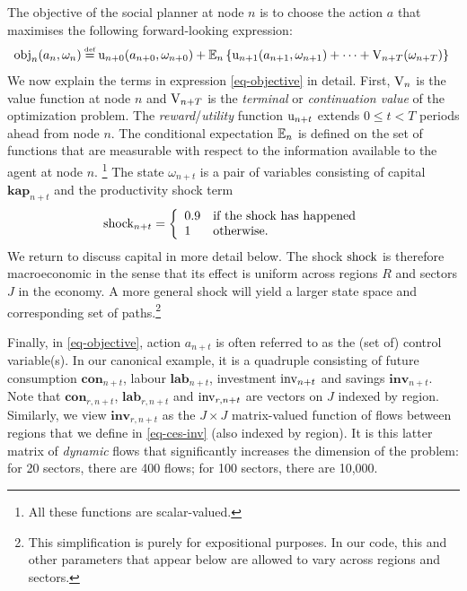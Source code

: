 \documentclass[12pt,a4paper,twoside, draft]{article}
\begin{document}
The objective of the social planner at node $n$ is to choose the action $a$
that maximises the following forward-looking expression:
\begin{align}\label{eq-objective}
\hskip-3pt   \textup{obj}_{n}(a_{n}, \omega_{n}) \defeq
   \textup{u}_{n + 0}(a_{n + 0}, \omega_{n + 0})
    + \mbb{E}_{n}\left\{
      \textup{u}_{n + 1}(a_{n + 1}, \omega_{n + 1}) + \cdots
      + \textup{V}_{n + T}(\omega_{n + T})
    \right\}
\end{align}
We now explain the terms in expression \eqref{eq-objective} in detail.
First, $\textup{V}_{n}$ is the value function at node $n$ and
$\textup{V}_{n + T}$ is the \emph{terminal} or \emph{continuation value} of the
optimization problem.
The \emph{reward}/\emph{utility} function $\textup{u}_{n + t}$ extends
$0 \leq t < T$ periods ahead from node $n$.
The conditional expectation $\mathbb{E}_{n}$ is defined on the set of functions
that are measurable with respect to the information available to the agent at 
node $n$.
\footnote{
   All these functions are scalar-valued.
}
The state $\omega_{n + t} $ is a pair of variables consisting  of capital
$\mathbf{kap}_{n + t}$ and the productivity shock term
\begin{equation}
   \textup{shock}_{n + t} = \left\{
      \begin{array}{ll}
         0.9 & \textup{if the shock has happened}\\
         1 & \textup{otherwise.}
      \end{array}\right.
\end{equation}
We return to discuss capital in more detail below.
The shock $\textup{shock}$ is therefore macroeconomic in the sense that
its effect is uniform across regions $R$ and sectors $J$ in the economy.
A more general shock will yield a larger state space and corresponding set of
paths.\footnote{
   This simplification is purely for expositional purposes.
   In our code, this and other parameters that appear below are allowed to vary 
   across regions and sectors.
}

Finally, in \eqref{eq-objective}, action $a_{n + t}$ is often referred to as
the (set of) control variable(s).
In our canonical example, it is a quadruple consisting of future consumption
$\mathbf{con}_{n + t}$, labour $\mathbf{lab}_{n + t}$, investment
$\textup{inv}_{n + t}$ and savings $\mathbf{inv}_{n + t}$.
Note that $\mathbf{con}_{r, n + t}$, $\mathbf{lab}_{r, n + t}$ and
$\textup{inv}_{r, n + t}$ are vectors on $J$ indexed by region.
Similarly, we view $\mathbf{inv}_{r, n + t}$ as the $J\times J$ matrix-valued
function of flows between regions that we define in \eqref{eq-ces-inv} (also
indexed by region).
It is this latter matrix of \emph{dynamic} flows that significantly increases
the dimension of the problem: for 20 sectors, there are 400 flows; for 100
sectors, there are 10,000.
\end{document}
